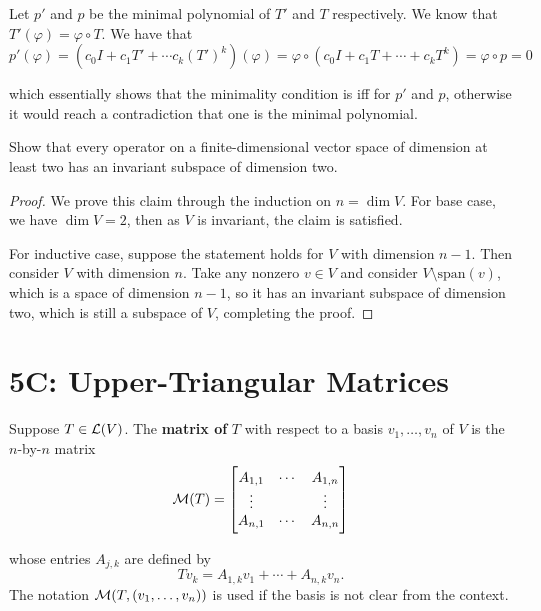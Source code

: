 \documentclass{extarticle}
\begin{document}
Let \(p'\) and \(p\) be the minimal polynomial of \(T'\) and \(T\) respectively. We know that \(T'(\varphi)
= \varphi \circ T\). We have that  
\[p'(\varphi) = (c_0 I + c_1 T' + \cdots c_k(T')^k)(\varphi) 
= \varphi \circ (c_0 I + c_1 T + \cdots + c_k T^k) = \varphi \circ p = 0\]

which essentially shows that the minimality condition is iff for \(p'\) and \(p\), otherwise it would reach 
a contradiction that one is the minimal polynomial.

\begin{problem}{29}
    Show that every operator on a finite-dimensional vector space of dimension at least two has an 
    invariant subspace of dimension two. 
\end{problem}

\begin{proof}
We prove this claim through the induction on \(n = \dim V\). For base case, we have \(\dim V = 2\), then as 
\(V\) is invariant, the claim is satisfied. 

For inductive case, suppose the statement holds for \(V\) with dimension \(n-1\). Then consider \(V\) with 
dimension \(n\). Take any nonzero \(v \in V\) and consider \(V \setminus \text{span}(v)\), which is a space of 
dimension \(n - 1\), so it has an invariant subspace of dimension two, which is still a subspace of \(V\), 
completing the proof.
\end{proof}


\newpage 
\section*{5C: Upper-Triangular Matrices}

\begin{definition}
    Suppose \(T \in \mathcal{L}(V)\). The \textbf{matrix of} \(T\) with respect to a basis 
    \(v_1, \ldots, v_n\) of \(V\) is the \(n\)-by-\(n\) matrix 
    \[\mathcal{M}(T) = \begin{bmatrix}
        A_{1,1} & \cdots & A_{1, n} \\ 
        \vdots &  & \vdots  \\ 
        A_{n, 1} & \cdots & A_{n,n}
    \end{bmatrix}\]

    whose entries \(A_{j, k}\) are defined by 
    \[Tv_k = A_{1, k}v_1 + \cdots + A_{n, k} v_n .\]
    The notation \(\mathcal{M}(T, (v_1, \ldots, v_n))\) is used if the basis is not clear from the context. 
\end{definition}
\end{document}
